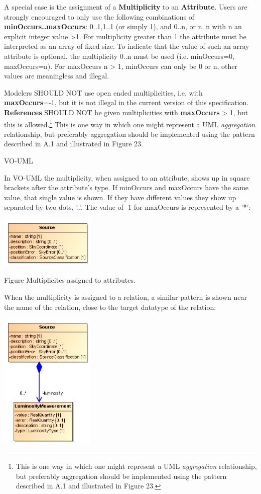 \documentclass[10pt,a4paper]{ivoa}
\begin{document}
A special case is the assignment of a \textbf{Multiplicity} to an
\textbf{Attribute}. Users are strongly encouraged to only use the
following combinations of \textbf{minOccurs..maxOccurs}: 0..1,1..1 (or
simply 1), and 0..n, or n..n with n an explicit integer value
\textgreater1. For multiplicity greater than 1 the attribute must be
interpreted as an array of fixed size. To indicate that the value of
such an array attribute is optional, the multiplicity 0..n must be used
(i.e. minOccurs=0, maxOccurs=n). For maxOccurs n \textgreater{} 1,
minOccurs can only be 0 or n, other values are meaningless and illegal.

Modelers SHOULD NOT use open ended multiplicities, i.e. with
\textbf{maxOccurs}=-1, but it is not illegal in the current version of
this specification. \textbf{References} SHOULD NOT be given
multiplicities with \textbf{maxOccurs} \textgreater{} 1, but this is
allowed.\footnote{This is one way in which one might represent a UML
  \emph{aggregation} relationship, but preferably aggregation should be
  implemented using the pattern described in A.1 and illustrated in
  Figure 23.} This is one way in which one might represent a UML
\emph{aggregation} relationship, but preferably aggregation should be
implemented using the pattern described in A.1 and illustrated in Figure
23.

VO-UML

In VO-UML the multiplicity, when assigned to an attribute, shows up in
square brackets after the attribute's type. If minOccurs and maxOccurs
have the same value, that single value is shown. If they have different
values they show up separated by two dots, '..'. The value of -1 for
maxOccurs is represented by a '*':

\includegraphics[width=1.8in,height=0.96667in]{./media/image16.png}

Figure Multiplicites assigned to attributes.

When the multiplicity is assigned to a relation, a similar pattern is
shown near the name of the relation, close to the target datatype of the
relation:

\includegraphics[width=1.8in,height=2.6in]{./media/image19.png}
\end{document}
